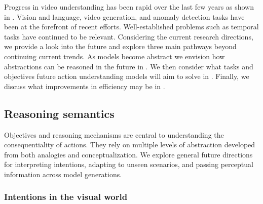 Progress in video understanding has been rapid over the last few years as shown in . Vision and language, video generation, and anomaly detection tasks have been at the forefront of recent efforts. Well-established problems such as temporal tasks have continued to be relevant. Considering the current research directions, we provide a look into the future and explore three main pathways beyond continuing current trends. As models become abstract we envision how abstractions can be reasoned in the future in . We then consider what tasks and objectives future action understanding models will aim to solve in . Finally, we discuss what improvements in efficiency may be in .





\subsection{Reasoning semantics}
\label{sec:outlook::reason}


Objectives and reasoning mechanisms are central to understanding the consequentiality of actions. They rely on multiple levels of abstraction developed from both analogies and conceptualization. We explore general future directions for interpreting intentions, adapting to unseen scenarios, and passing perceptual information across model generations. 


\subsubsection{Intentions in the visual world}

